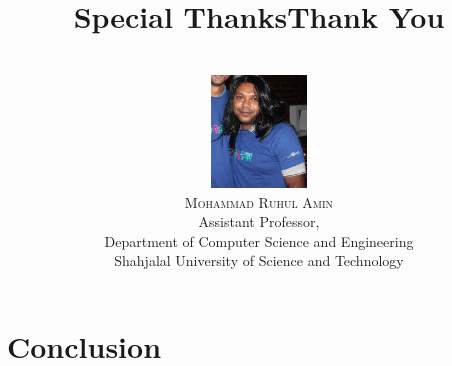 \section{Conclusion}
\title[NanoMapper]{Special Thanks}
\author[Enam \& Gaurab (SUST)]{\vspace{2mm}\\ \includegraphics[height=3cm]{./shajibsir}\\ \textsc{\large Mohammad Ruhul Amin}\\Assistant Professor,\\Department of Computer Science and Engineering\\Shahjalal University of Science and Technology}
\begin{frame}
	\maketitle
\end{frame}
\usebackgroundtemplate{}
\title[NanoMapper]{Thank You}
\author[Enam \& Gaurab (SUST)]{}
\begin{frame}
	\vfill
	\vfill
	\maketitle

\end{frame}